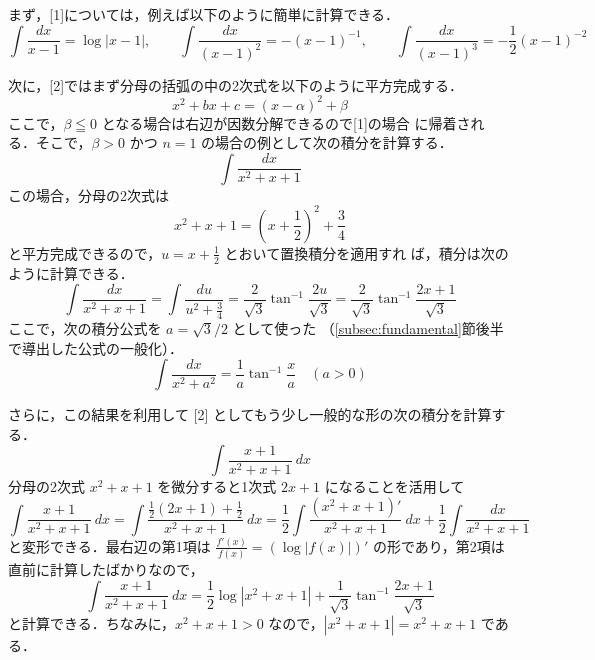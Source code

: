 \documentclass[10pt, uplatex, dvipdfmx]{jsarticle}
\theoremstyle{definition}
\numberwithin{equation}{section}
\newcommand{\ds}{\displaystyle}
\begin{document}
\vspace{1zh}

まず，[1]については，例えば以下のように簡単に計算できる．
\[
  \int \frac{dx}{x-1} = \log|x-1|, \qquad \int \frac{dx}{(x-1)^2} = -(x-1)^{-1}, \qquad
  \int \frac{dx}{(x-1)^3} = -\frac{1}{2} (x-1)^{-2}
\]

\vspace{1zh}

次に，[2]ではまず分母の括弧の中の2次式を以下のように平方完成する．
\begin{equation}\label{eq:sq-comp}
  x^2+bx+c = (x-\alpha)^2 + \beta
\end{equation}
ここで，$\beta \leqq 0$ となる場合は右辺が因数分解できるので[1]の場合
に帰着される．そこで，$\beta >0$ かつ $n=1$ の場合の例として次の積分を計算する．
\[
  \int \frac{dx}{x^2+x+1}
\]
この場合，分母の2次式は
\[
  x^2+x+1 = \left( x+ \frac{1}{2}\right)^2 + \frac{3}{4}
\]
と平方完成できるので，$\ds u=x+\frac{1}{2}$ とおいて置換積分を適用すれ
ば，積分は次のように計算できる．
\[
  \int \frac{dx}{x^2+x+1} = \int \frac{du}{u^2+ \frac{3}{4}} = \frac{2}{\sqrt{3}} \tan^{-1} \frac{2u}{\sqrt{3}}
  = \frac{2}{\sqrt{3}} \tan^{-1} \frac{2x+1}{\sqrt{3}}
\]
ここで，次の積分公式を $a= \sqrt{3}/2$ として使った
（\ref{subsec:fundamental}節後半で導出した公式の一般化）．
\[
  \int \frac{dx}{x^2+a^2} = \frac{1}{a} \tan^{-1} \frac{x}{a} \quad (a >0)
\]

\vspace{1zh}

さらに，この結果を利用して [2] としてもう少し一般的な形の次の積分を計算する．
\[
  \int \frac{x+1}{x^2+x+1} \ dx
\]
分母の2次式 $x^2+x+1$ を微分すると1次式 $2x+1$ になることを活用して
\[
  \int \frac{ x+1}{x^2+x+1} \ dx  = \int \frac{\frac{1}{2}\left( 2x+1\right) + \frac{1}{2}}{x^2+x+1} \ dx
  = \frac{1}{2} \int \frac{(x^2+x+1)'}{x^2+x+1}\ dx + \frac{1}{2}\int\frac{dx}{x^2+x+1}
\]
と変形できる．最右辺の第1項は $\ds \frac{f'(x)}{f(x)} = \left( \log \left|f(x)\right|
\right)'$ の形であり，第2項は直前に計算したばかりなので，
\[
  \int \frac{x+1}{x^2+x+1}\ dx = \frac{1}{2}\log\left| x^2+x+1\right|
  + \frac{1}{\sqrt{3}}\tan^{-1}\frac{2x+1}{\sqrt{3}}
\]
と計算できる．ちなみに，$x^2+x+1>0$ なので，$\left| x^2+x+1 \right|= x^2+x+1 $ である．

\newpage
\end{document}
